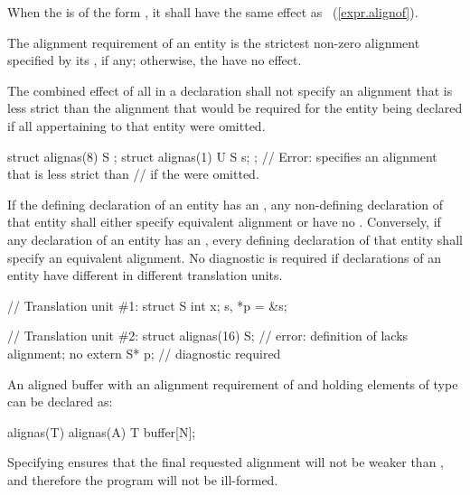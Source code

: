 \pnum
When the  is of the form
  \tcode{)}, it shall have the same
effect as \tcode{))}~(\ref{expr.alignof}).

\pnum
The alignment requirement of an entity is the strictest non-zero alignment
specified by its , if any;
otherwise, the  have no effect.

\pnum
The combined effect of all  in a declaration shall not
specify an alignment that is less strict than the alignment that would
be required for the entity being declared if all 
appertaining to that entity
were omitted.
\begin{example}
\begin{codeblock}
struct alignas(8) S {};
struct alignas(1) U {
  S s;
};   // Error:  specifies an alignment that is less strict than
     // if the  were omitted.
\end{codeblock}
\end{example}

\pnum
If the defining declaration of an entity has an
, any non-defining
declaration of that entity shall either specify equivalent alignment or have no
.
Conversely, if any declaration of an entity has an
,
every defining
declaration of that entity shall specify an equivalent alignment.
No diagnostic is required if declarations of an entity have
different 
in different translation units.

\begin{example}
\begin{codeblock}
// Translation unit \#1:
struct S { int x; } s, *p = &s;

// Translation unit \#2:
struct alignas(16) S;           // error: definition of  lacks alignment; no
extern S* p;                    // diagnostic required
\end{codeblock}
\end{example}

\pnum
\begin{example} An aligned buffer with an alignment requirement
of  and holding  elements of type 
can be declared as:

\begin{codeblock}
alignas(T) alignas(A) T buffer[N];
\end{codeblock}
Specifying  ensures
that the final requested alignment will not be weaker than ,
and therefore the program will not be ill-formed.
\end{example}

